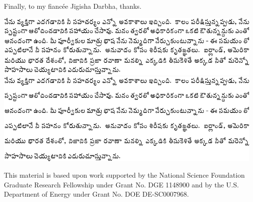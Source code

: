 Finally, to my fiancée Jigisha Darbha, thanks. %

\ifdefined\printmode
\noindent
\includegraphics[width=1.0\textwidth]{telugu/thanks_singlespace.pdf}
\newline
\else
\vspace{12pt}
\noindent
\includegraphics[width=1.0\textwidth]{telugu/thanks_doublespace.pdf}
\newpage
\fi

This material is based upon work supported by the National Science Foundation
Graduate Research Fellowship under Grant No. DGE 1148900
and by the U.S. Department of Energy under Grant No. DOE DE-SC0007968.
